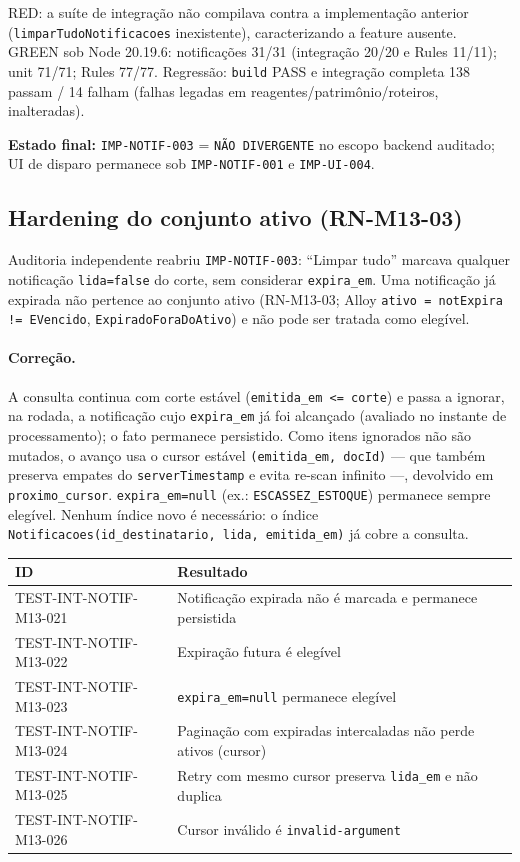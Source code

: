 RED: a suíte de integração não compilava contra a implementação anterior
(\texttt{limparTudoNotificacoes} inexistente), caracterizando a feature ausente.
GREEN sob Node 20.19.6: notificações 31/31 (integração 20/20 e Rules 11/11);
unit 71/71; Rules 77/77. Regressão: \texttt{build} PASS e integração completa
138 passam / 14 falham (falhas legadas em reagentes/patrimônio/roteiros,
inalteradas).

\textbf{Estado final:} \texttt{IMP-NOTIF-003} = \texttt{NÃO DIVERGENTE} no
escopo backend auditado; UI de disparo permanece sob \texttt{IMP-NOTIF-001} e
\texttt{IMP-UI-004}.

\subsection{Hardening do conjunto ativo (RN-M13-03)}

Auditoria independente reabriu \texttt{IMP-NOTIF-003}: ``Limpar tudo'' marcava
qualquer notificação \texttt{lida=false} do corte, sem considerar
\texttt{expira\_em}. Uma notificação já expirada não pertence ao conjunto ativo
(RN-M13-03; Alloy \texttt{ativo = notExpira != EVencido},
\texttt{ExpiradoForaDoAtivo}) e não pode ser tratada como elegível.

\paragraph{Correção.} A consulta continua com corte estável
(\texttt{emitida\_em <= corte}) e passa a ignorar, na rodada, a notificação cujo
\texttt{expira\_em} já foi alcançado (avaliado no instante de processamento);
o fato permanece persistido. Como itens ignorados não são mutados, o avanço usa
o cursor estável \texttt{(emitida\_em, docId)} — que também preserva empates do
\texttt{serverTimestamp} e evita re-scan infinito —, devolvido em
\texttt{proximo\_cursor}. \texttt{expira\_em=null} (ex.: \texttt{ESCASSEZ\_ESTOQUE})
permanece sempre elegível. Nenhum índice novo é necessário: o índice
\texttt{Notificacoes(id\_destinatario, lida, emitida\_em)} já cobre a consulta.

\small
\begin{longtable}{@{}p{}p{}@{}}
\toprule
ID & Resultado \\
\midrule
\endhead
TEST-INT-NOTIF-M13-021 & Notificação expirada não é marcada e permanece persistida \\
TEST-INT-NOTIF-M13-022 & Expiração futura é elegível \\
TEST-INT-NOTIF-M13-023 & \texttt{expira\_em=null} permanece elegível \\
TEST-INT-NOTIF-M13-024 & Paginação com expiradas intercaladas não perde ativos (cursor) \\
TEST-INT-NOTIF-M13-025 & Retry com mesmo cursor preserva \texttt{lida\_em} e não duplica \\
TEST-INT-NOTIF-M13-026 & Cursor inválido é \texttt{invalid-argument} \\
\bottomrule
\end{longtable}
\normalsize

